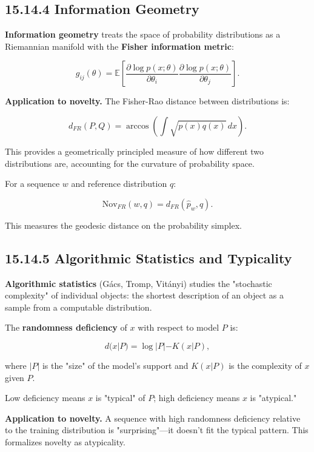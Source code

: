 \subsection{15.14.4 Information Geometry}

\textbf{Information geometry} treats the space of probability distributions as a Riemannian manifold with the \textbf{Fisher information metric}:

\[g_{ij}(\theta) = \mathbb{E}\left[ \frac{\partial \log p(x; \theta)}{\partial \theta_i} \frac{\partial \log p(x; \theta)}{\partial \theta_j} \right].\]

\textbf{Application to novelty.} The Fisher-Rao distance between distributions is:

\[d_{FR}(P, Q) = \arccos\left( \int \sqrt{p(x) q(x)} \, dx \right).\]

This provides a geometrically principled measure of how different two distributions are, accounting for the curvature of probability space.

\begin{definition}
For a sequence $w$ and reference distribution $q$:

\[\mathrm{Nov}_{FR}(w, q) = d_{FR}(\hat{p}_w, q).\]

This measures the geodesic distance on the probability simplex.
\end{definition}

\subsection{15.14.5 Algorithmic Statistics and Typicality}

\textbf{Algorithmic statistics} (Gács, Tromp, Vitányi) studies the "stochastic complexity" of individual objects: the shortest description of an object as a sample from a computable distribution.

\begin{definition}
The \textbf{randomness deficiency} of $x$ with respect to model $P$ is:

\[d(x | P) = \log |P| - K(x | P),\]

where $|P|$ is the "size" of the model's support and $K(x|P)$ is the complexity of $x$ given $P$.

Low deficiency means $x$ is "typical" of $P$; high deficiency means $x$ is "atypical."

\textbf{Application to novelty.} A sequence with high randomness deficiency relative to the training distribution is "surprising"---it doesn't fit the typical pattern. This formalizes novelty as atypicality.
\end{definition}

